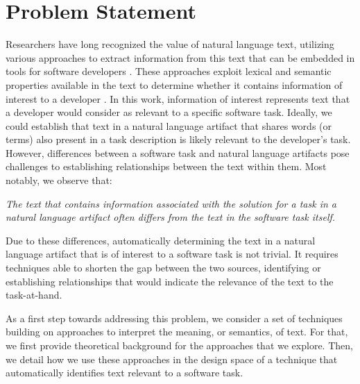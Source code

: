 
\section{Problem Statement}
\label{cp5:motivation}





Researchers have long recognized the value of natural language
text, utilizing various approaches to extract
information from this text that can be embedded in
tools for software developers .
These approaches exploit lexical and semantic properties available in the text to determine 
whether it contains information of interest to a developer . 
In this work, information of interest represents text that a developer would consider as relevant to a specific software task. Ideally, we could establish that text in a natural language artifact that shares  
words (or terms) also present in a task description is likely relevant to the developer's task. However, differences between a software task and natural language artifacts pose challenges to establishing relationships between the text within them. Most notably, we observe that:



\medskip
\begin{bluequote}
    \textit{The text  that contains information associated with the solution for a task in a natural language artifact often differs from the text in the software task itself.}
\end{bluequote}



Due to these differences, automatically determining the text in a natural language artifact that is of interest to a software task is not trivial. 
It requires techniques able to shorten the gap between the two sources, identifying or establishing relationships that would indicate the relevance of the text to the task-at-hand.


As a first step towards addressing this problem, we consider a set of techniques
 building on approaches to interpret the meaning, or semantics, of text.
 For that, we first provide theoretical background for the approaches that we explore. Then, we detail how we use these approaches in the design space of a technique that automatically identifies text relevant to a software task.






